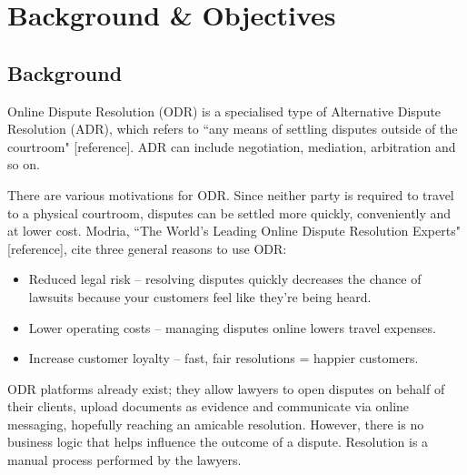 \chapter{Background \& Objectives}


\section{Background} %

Online Dispute Resolution (ODR) is a specialised type of Alternative Dispute Resolution (ADR), which refers to ``any means of settling disputes outside of the courtroom" [reference]. ADR can include negotiation, mediation, arbitration and so on. %

There are various motivations for ODR. Since neither party is required to travel to a physical courtroom, disputes can be settled more quickly, conveniently and at lower cost. Modria, ``The World’s Leading Online Dispute Resolution Experts" [reference], cite three general reasons to use ODR: %

\begin{itemize}
    \item Reduced legal risk – resolving disputes quickly decreases the chance of lawsuits because your customers feel like they’re being heard.
    \item Lower operating costs – managing disputes online lowers travel expenses.
    \item Increase customer loyalty – fast, fair resolutions = happier customers.
\end{itemize}

ODR platforms already exist; they allow lawyers to open disputes on behalf of their clients, upload documents as evidence and communicate via online messaging, hopefully reaching an amicable resolution. However, there is no business logic that helps influence the outcome of a dispute. Resolution is a manual process performed by the lawyers.

